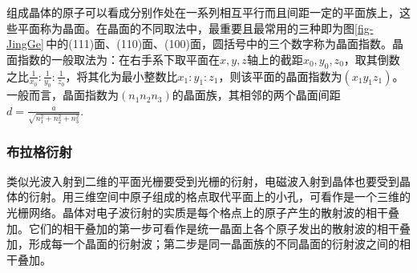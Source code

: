 \documentclass[UTF-8,twoside,cs4size]{ctexart}
\begin{document}
		组成晶体的原子可以看成分别作处在一系列相互平行而且间距一定的平面族上，这些平面称为晶面。在晶面的不同取法中，最重要且最常用的三种即为图\ref{fig-JingGe}\,中的(111)面、(110)面、(100)面，圆括号中的三个数字称为晶面指数。晶面指数的一般取法为：在右手系下取平面在$ x,y,z $轴上的截距$ x_0,y_0,z_0 $，取其倒数之比$ \frac1{x_0}:\frac1{y_0}:\frac1{z_0} $，将其化为最小整数比$ x_1:y_1:z_1 $，则该平面的晶面指数为$ (x_1y_1z_1) $。一般而言，晶面指数为$ (n_1n_2n_3) $的晶面族，其相邻的两个晶面间距$ d=\frac{a}{\sqrt{n_1^2+n_2^2+n_3^2}} $.
		
		\subsubsection{布拉格衍射}
		
		类似光波入射到二维的平面光栅要受到光栅的衍射，电磁波入射到晶体也要受到晶体的衍射。用三维空间中原子组成的格点取代平面上的小孔，可看作是一个三维的光栅网络。晶体对电子波衍射的实质是每个格点上的原子产生的散射波的相干叠加。它们的相干叠加的第一步可看作是统一晶面上各个原子发出的散射波的相干叠加，形成每一个晶面的衍射波；第二步是同一晶面族的不同晶面的衍射波之间的相干叠加。
		
\end{document}
